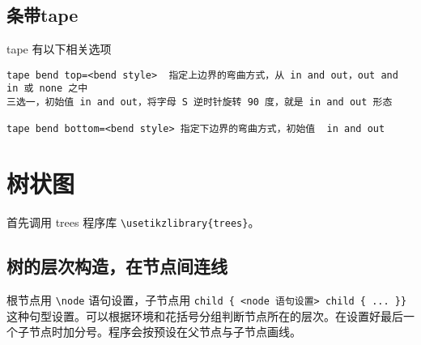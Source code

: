 \documentclass[UTF8]{ctexart}
\begin{document}
\subsection{ 条带tape }

tape 有以下相关选项
\begin{lstlisting}
tape bend top=<bend style>  指定上边界的弯曲方式，从 in and out，out and in 或 none 之中
三选一，初始值 in and out，将字母 S 逆时针旋转 90 度，就是 in and out 形态

tape bend bottom=<bend style> 指定下边界的弯曲方式，初始值  in and out
\end{lstlisting}








\section{树状图}

首先调用 trees 程序库 \verb!\usetikzlibrary{trees}!。

\subsection{树的层次构造，在节点间连线}

根节点用 \verb!\node! 语句设置，子节点用 \verb!child { <node 语句设置> child { ... }}! 这种句型设置。可以根据环境和花括号分组判断节点所在的层次。在设置好最后一个子节点时加分号。程序会按预设在父节点与子节点画线。
\end{document}
